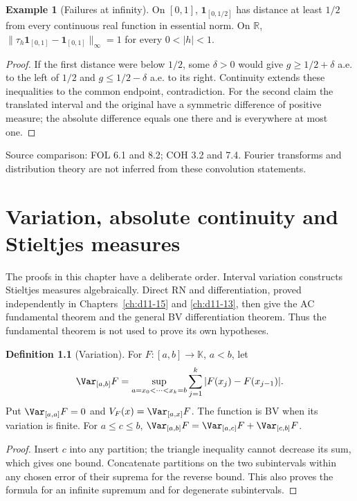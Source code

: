 \documentclass[11pt,oneside,openany]{book}
\theoremstyle{definition}
\newtheorem{definition}[theorem]{Definition}
\newtheorem{example}[theorem]{Example}
\theoremstyle{remark}
\newcommand{\R}{\mathbb R}\newcommand{\C}{\mathbb C}
\newcommand{\one}{\mathbf1}\newcommand{\ind}[1]{\mathbf1_{#1}}
\newcommand{\family}[1]{}
\newcommand{\source}[1]{\par\begingroup\small\sffamily\color{black!65}Source comparison: #1\par\endgroup}
\begin{document}
\begin{example}[Failures at infinity]\family{D11.11.infinity_density_failure}\label{d11:11:infinity-density-failure}
On $[0,1]$, $\one_{[0,1/2]}$ has distance at least $1/2$ from every
continuous real function in essential norm. On $\R$,
$\|\tau_h\one_{[0,1]}-\one_{[0,1]}\|_\infty=1$ for every
$0<|h|<1$.
\end{example}
\begin{proof}
If the first distance were below $1/2$, some $\delta>0$ would give
$g\geq1/2+\delta$ a.e. to the left of $1/2$ and
$g\leq1/2-\delta$ a.e. to its right. Continuity extends these inequalities
to the common endpoint, contradiction. For the second claim the translated
interval and the original have a symmetric difference of positive measure;
the absolute difference equals one there and is everywhere at most one.
\end{proof}
\source{FOL 6.1 and 8.2; COH 3.2 and 7.4. Fourier transforms and distribution theory are not inferred from these convolution statements.}



\chapter{Variation, absolute continuity and Stieltjes measures}\label{ch:d11-12}

The proofs in this chapter have a deliberate order. Interval variation
constructs Stieltjes measures algebraically. Direct RN and differentiation,
proved independently in Chapters~\ref{ch:d11-15} and \ref{ch:d11-13}, then
give the AC fundamental theorem and the general BV differentiation theorem.
Thus the fundamental theorem is not used to prove its own hypotheses.

\begin{definition}[Variation]\family{D11.12.bv_definition}\label{d11:12:bv-definition}
For $F:[a,b]\to\mathbb K$, $a<b$, let
\[
 \Var_{[a,b]}F=\sup_{a=x_0<\cdots<x_k=b}
       \sum_{j=1}^k|F(x_j)-F(x_{j-1})|.
\]
Put $\Var_{[a,a]}F=0$ and $V_F(x)=\Var_{[a,x]}F$.
The function is BV when its variation is finite. For $a\leq c\leq b$,
$\Var_{[a,b]}F=\Var_{[a,c]}F+\Var_{[c,b]}F$.
\end{definition}
\begin{proof}
Insert $c$ into any partition; the triangle inequality cannot decrease
its sum, which gives one bound. Concatenate partitions on the two
subintervals within any chosen error of their suprema for the reverse
bound. This also proves the formula for an infinite supremum and for
degenerate subintervals.
\end{proof}
\end{document}
